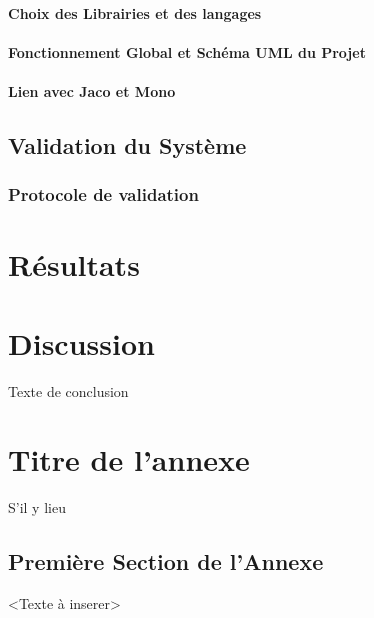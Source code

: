 \documentclass[letterpaper, twoside, 12pt, memoire, creativecommons, hyperref]{thETS}
\begin{document}
\subsubsection{Choix des Librairies et des langages}

\subsubsection{Fonctionnement Global et Schéma UML du Projet}

\subsubsection{Lien avec Jaco et Mono}

\section{Validation du Système}

\subsection{Protocole de validation}

\chapter{Résultats}

\chapter{Discussion}

\begin{conclusion}
Texte de conclusion

\end{conclusion}


\appendix


\multiannexe %
%
\chapter{Titre de l'annexe} 

S'il y lieu

\section{Première Section de l'Annexe}
<Texte à inserer> 
\end{document}

